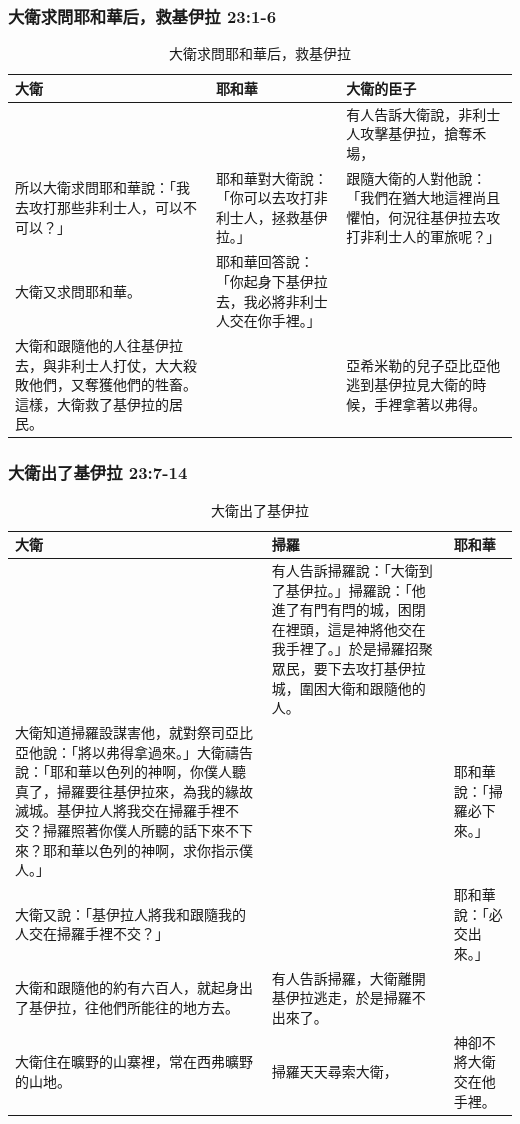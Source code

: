 \subsubsection{大衛求問耶和華后，救基伊拉 23:1-6}
\begin{table}[H]
\centering 
\begin{tabular}{p{}|p{5.25cm}|p{5.25cm}}\hline\hline
大衛&耶和華&大衛的臣子\\\hline
&&有人告訴大衛說，非利士人攻擊基伊拉，搶奪禾場，\\\hline
所以大衛求問耶和華說：「我去攻打那些非利士人，可以不可以？」
&耶和華對大衛說：「你可以去攻打非利士人，拯救基伊拉。」
&跟隨大衛的人對他說：「我們在猶大地這裡尚且懼怕，何況往基伊拉去攻打非利士人的軍旅呢？」\\\hline
大衛又求問耶和華。
&耶和華回答說：「你起身下基伊拉去，我必將非利士人交在你手裡。」&\\\hline
大衛和跟隨他的人往基伊拉去，與非利士人打仗，大大殺敗他們，又奪獲他們的牲畜。這樣，大衛救了基伊拉的居民。&&亞希米勒的兒子亞比亞他逃到基伊拉見大衛的時候，手裡拿著以弗得。\\\hline
\end{tabular}
\caption{大衛求問耶和華后，救基伊拉}
\end{table}

\subsubsection{大衛出了基伊拉 23:7-14}
\begin{table}[H]
\centering 
\begin{tabular}{p{}|p{7.25cm}|p{2.25cm}}\hline\hline
大衛&掃羅&耶和華\\\hline
&有人告訴掃羅說：「大衛到了基伊拉。」掃羅說：「他進了有門有閂的城，困閉在裡頭，這是神將他交在我手裡了。」於是掃羅招聚眾民，要下去攻打基伊拉城，圍困大衛和跟隨他的人。&\\\hline
大衛知道掃羅設謀害他，就對祭司亞比亞他說：「將以弗得拿過來。」大衛禱告說：「耶和華以色列的神啊，你僕人聽真了，掃羅要往基伊拉來，為我的緣故滅城。基伊拉人將我交在掃羅手裡不交？掃羅照著你僕人所聽的話下來不下來？耶和華以色列的神啊，求你指示僕人。」
&&耶和華說：「掃羅必下來。」 \\\hline
大衛又說：「基伊拉人將我和跟隨我的人交在掃羅手裡不交？」
& &耶和華說：「必交出來。」\\\hline
大衛和跟隨他的約有六百人，就起身出了基伊拉，往他們所能往的地方去。&有人告訴掃羅，大衛離開基伊拉逃走，於是掃羅不出來了。&\\\hline
大衛住在曠野的山寨裡，常在西弗曠野的山地。&掃羅天天尋索大衛，&神卻不將大衛交在他手裡。\\\hline
\end{tabular}
\caption{大衛出了基伊拉}
\end{table}


